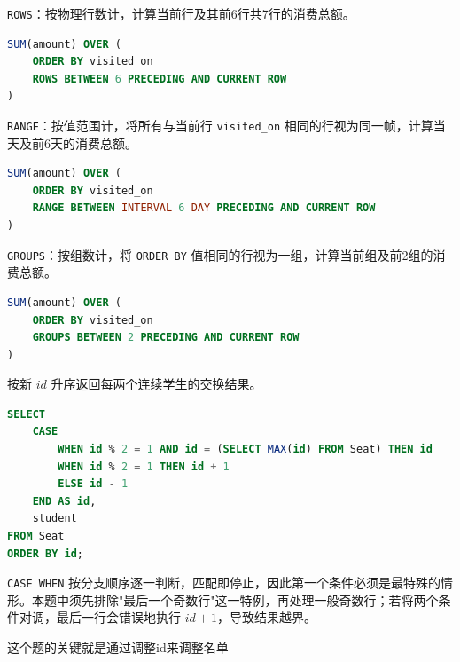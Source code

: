 \begin{homework}[1321 | 高级查询和连接 第11题]
\begin{example}
\texttt{ROWS}：按物理行数计，计算当前行及其前6行共7行的消费总额。
\begin{lstlisting}[language=SQL]
SUM(amount) OVER (
    ORDER BY visited_on
    ROWS BETWEEN 6 PRECEDING AND CURRENT ROW
)
\end{lstlisting}
\end{example}

\begin{example}
\texttt{RANGE}：按值范围计，将所有与当前行 \texttt{visited\_on} 相同的行视为同一帧，计算当天及前6天的消费总额。
\begin{lstlisting}[language=SQL]
SUM(amount) OVER (
    ORDER BY visited_on
    RANGE BETWEEN INTERVAL 6 DAY PRECEDING AND CURRENT ROW
)
\end{lstlisting}
\end{example}

\begin{example}
\texttt{GROUPS}：按组数计，将 \texttt{ORDER BY} 值相同的行视为一组，计算当前组及前2组的消费总额。
\begin{lstlisting}[language=SQL]
SUM(amount) OVER (
    ORDER BY visited_on
    GROUPS BETWEEN 2 PRECEDING AND CURRENT ROW
)
\end{lstlisting}
\end{example}
\end{homework}

\begin{homework}[626 | 高级查询和连接 第9题]
\begin{solution}
按新 $id$ 升序返回每两个连续学生的交换结果。

\begin{lstlisting}[language=SQL]
SELECT
    CASE
        WHEN id % 2 = 1 AND id = (SELECT MAX(id) FROM Seat) THEN id
        WHEN id % 2 = 1 THEN id + 1
        ELSE id - 1
    END AS id,
    student
FROM Seat
ORDER BY id;
\end{lstlisting}

\begin{note}
\texttt{CASE WHEN} 按分支顺序逐一判断，匹配即停止，因此第一个条件必须是最特殊的情形。本题中须先排除"最后一个奇数行"这一特例，再处理一般奇数行；若将两个条件对调，最后一行会错误地执行 $id+1$，导致结果越界。
\end{note}
\end{solution}
\begin{dxtips}
    这个题的关键就是通过调整id来调整名单
\end{dxtips}
\end{homework}

